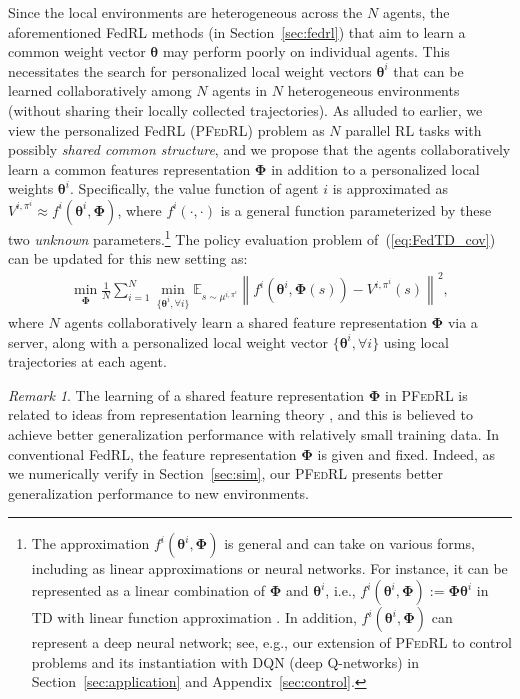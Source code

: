 \documentclass{article} %
\def\eqref#1{equation~\ref{#1}}
\theoremstyle{plain}
\theoremstyle{definition}
\theoremstyle{remark}
\newtheorem{remark}[theorem]{Remark}
\renewcommand{\eqref}[1]{(\ref{#1})}
\newcommand{\PFRL}{\textsc{PFedRL}\xspace}
\begin{document}
Since the local environments are heterogeneous across the $N$ agents, the aforementioned FedRL methods (in Section~\ref{sec:fedrl}) that aim to learn a common weight vector $\pmb{\theta}$ may perform poorly on individual agents. This necessitates the search for personalized local weight vectors $\pmb{\theta}^i$ that can be learned collaboratively among $N$ agents in $N$ heterogeneous environments (without sharing their locally collected trajectories).
As alluded to earlier, we view the personalized FedRL (\PFRL) problem as $N$ parallel RL tasks with possibly \emph{shared common structure}, and we propose that the agents collaboratively learn a common features representation $\pmb{\Phi}$ in addition to a personalized local weights $\pmb{\theta}^i$.
Specifically, the value function of agent $i$ is approximated as $V^{i,\pi^i} \!\approx f^i(\pmb{\theta}^i, \pmb{\Phi})$, where $f^i(\cdot,\cdot)$ is a general function parameterized by these two \textit{unknown} parameters.\footnote{The approximation $f^i(\pmb{\theta}^i, \pmb{\Phi})$ is general and can take on various forms, including as linear approximations or neural networks.  For instance, it can be represented as a linear combination of $\pmb{\Phi}$ and $\pmb{\theta}^i$, i.e., $f^i(\pmb{\theta}^i, \pmb{\Phi}):=\pmb{\Phi}\pmb{\theta}^i$ in TD  %
with linear function approximation \citep{bhandari2018finite}. In addition, $f^i(\pmb{\theta}^i, \pmb{\Phi})$ can represent a deep neural network; see, e.g., our extension of \PFRL to control problems and its instantiation with DQN (deep Q-networks) \citep{mnih2015human} in Section~\ref{sec:application} and Appendix~\ref{sec:control}.
}
The policy evaluation problem of~\eqref{eq:FedTD_cov} can be updated for this new setting as: 
\begin{align}\label{eq:PE-obj}
\min_{\pmb{\Phi}} \frac{1}{N}\sum_{i=1}^N \min_{\{\pmb{\theta}^i, \forall i\}} \mathbb{E}_{s\sim \mu^{i,\pi^i}}\left\|f^i(\pmb{\theta}^i, \pmb{\Phi}(s))-V^{i,\pi^i}(s)\right\|^2,
\end{align}
where $N$ agents collaboratively learn a shared feature representation $\pmb{\Phi}$ via a server, along with a personalized local weight vector $\{\pmb{\theta}^i,\forall i\}$ using local trajectories at each agent. 





\begin{remark}
The learning of a shared feature representation $\pmb{\Phi}$ in \PFRL is related to ideas from representation learning theory \citep{agarwal2020flambe,agarwal2023provable}, and this is believed to achieve better generalization performance with relatively small training data. In conventional FedRL, the feature representation $\pmb{\Phi}$ is given and fixed. Indeed, as we numerically verify in Section~\ref{sec:sim}, our \PFRL  presents better generalization performance to new environments.
\end{remark}
\end{document}
